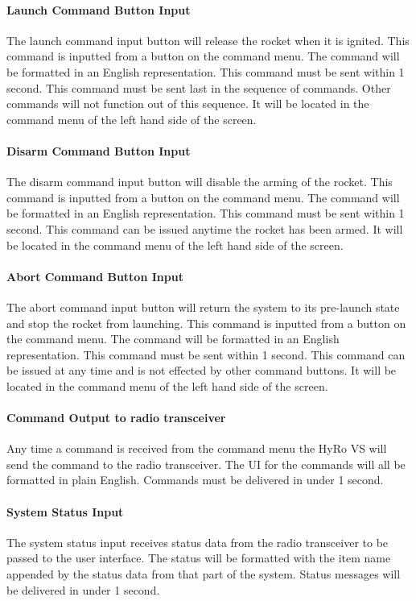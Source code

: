 \documentclass[10pt,draftclsnofoot,onecolumn,retainorgcmds]{IEEEtran}
\begin{document}
\paragraph{\bf Launch Command Button Input}
The launch command input button will release the rocket when it is ignited. This command is inputted from a button on the command menu. The command will be formatted in an English representation.  This command must be sent within 1 second. This command must be sent last in the sequence of commands. Other commands will not function out of this sequence. It will be located in the command menu of the left hand side of the screen.

\paragraph{\bf Disarm Command Button Input}
The disarm command input button will disable the arming of the rocket. This command is inputted from a button on the command menu. The command will be formatted in an English representation.  This command must be sent within 1 second. This command can be issued anytime the rocket has been armed. It will be located in the command menu of the left hand side of the screen.

\paragraph{\bf Abort Command Button Input}
The abort command input button will return the system to its pre-launch state and stop the rocket from launching. This command is inputted from a button on the command menu. The command will be formatted in an English representation.  This command must be sent within 1 second. This command can be issued at any time and is not effected by other command buttons. It will be located in the command menu of the left hand side of the screen.

\paragraph{\bf Command Output to radio transceiver}
Any time a command is received from the command menu the HyRo VS will send the command to the radio transceiver. The UI for the commands will all be formatted in plain English. Commands must be delivered in under 1 second.

\paragraph{\bf System Status Input}
The system status input receives status data from the radio transceiver to be passed to the user interface. The status will be formatted with the item name appended by the status data from that part of the system. Status messages will be delivered in under 1 second. 
\end{document}
